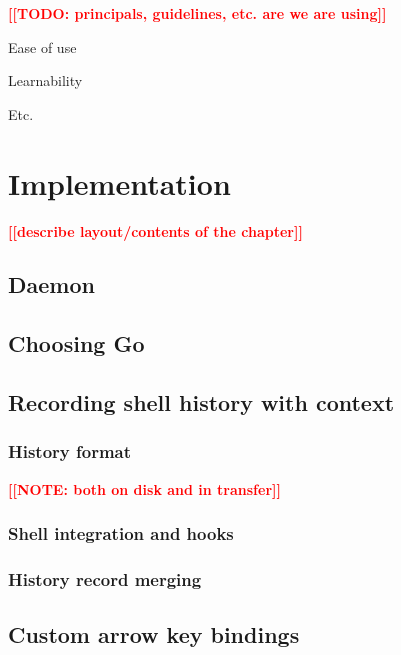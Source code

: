 \documentclass[thesis=M,english]{FITthesis}[2012/10/20]
\newcommand{\blind}[1][1]{}
\newcommand{\todotext}[1]{\textcolor{red}{\textbf{[[#1]]}}}
\begin{document}
\todotext{TODO: principals, guidelines, etc. are we are using}

Ease of use

Learnability

Etc.

\chapter{Implementation}


\todotext{describe layout/contents of the chapter}

\blind

\section{Daemon}

\blind

\section{Choosing Go}

\blind[3]

\section{Recording shell history with context}

\blind

\subsection{History format}

\todotext{NOTE: both on disk and in transfer}

\blind

\subsection{Shell integration and hooks}

\blind

\subsection{History record merging}

\blind

\section{Custom arrow key bindings}
\end{document}
